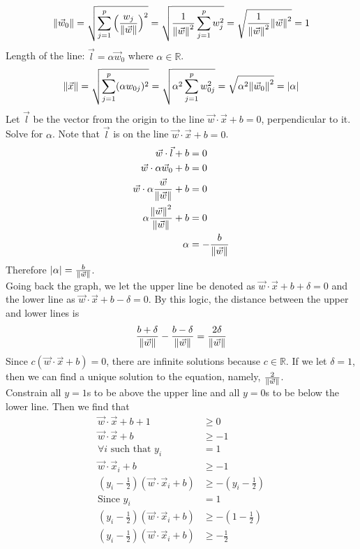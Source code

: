 \documentclass[12pt]{article}
\begin{document}
$$ \norm{\vec{w}_0} = \sqrt{ \sum_{j=1}^p \Big( \frac{w_j}{\norm{\vec{w}}} \Big)^2} = \sqrt{ \frac{1}{\norm{\vec{w}}^2} \sum_{j=1}^p w_j^2} = \sqrt{ \frac{1}{\norm{\vec{w}}^2} \norm{\vec{w}}^2} = 1 $$ 
Length of the line: $\vec{l} = \alpha \vec{w}_0$ where $\alpha \in \mathbb{R}$. 
$$ \norm{\vec{x}} = \sqrt{ \sum_{j=1}^p (\alpha w_{0j})^2} = \sqrt{ \alpha^2 \sum_{j=1}^p w_{0j}^2} = \sqrt{\alpha^2 \norm{\vec{w}_0}^2} = \abs{\alpha} $$ 
Let $\vec{l}$ be the vector from the origin to the line $\vec{w} \cdot \vec{x} + b = 0$, perpendicular to it. Solve for $\alpha$. Note that $\vec{l}$ is on the line $\vec{w} \cdot \vec{x} + b = 0$. 
$$ \begin{aligned} \vec{w} \cdot \vec{l} + b &= 0 \\ \vec{w} \cdot \alpha \vec{w}_0 + b &= 0 \\ 
\vec{w} \cdot \alpha \frac{ \vec{w}}{\norm{\vec{w}}} + b &= 0 \\ \alpha \frac{\norm{\vec{w}}^2}{\norm{\vec{w}}} + b &= 0 \\ \alpha &= - \frac{b}{\norm{\vec{w}}} \end{aligned} $$ Therefore 
$\abs{\alpha} = \frac{b}{\norm{\vec{w}}}$. \\
Going back the graph, we let the upper line be denoted as $\vec{w} \cdot \vec{x} + b + \delta = 0$ and the lower line as $\vec{w} \cdot \vec{x} + b - \delta = 0$. By this logic, the distance between the upper and lower lines is 
$$ \frac{b + \delta}{\norm{\vec{w}}} - \frac{b - \delta}{\norm{\vec{w}}} = \frac{2\delta}{\norm{\vec{w}}} $$ Since $c(\vec{w} \cdot \vec{x} + b) = 0$, there are infinite solutions because $c \in \mathbb{R}$. If we let $\delta = 1$, then we can find a unique solution to the equation, namely, $\frac{2}{\norm{\vec{w}}}$. \\
Constrain all $y = 1$s to be above the upper line and all $y = 0$s to be below the lower line. 
Then we find that $$ \begin{aligned} \vec{w} \cdot \vec{x} + b + 1 &\geq 0 \\ \vec{w} \cdot \vec{x} + b &\geq -1 \\ \forall i \text{ such that } y_i &= 1 \\ \vec{w} \cdot \vec{x}_i + b &\geq -1 \\ (y_i - \frac{1}{2})(\vec{w} \cdot \vec{x}_i + b) &\geq -(y_i - \frac{1}{2}) \\ \text{Since } y_i &= 1 \\ (y_i - \frac{1}{2})(\vec{w} \cdot \vec{x}_i + b) &\geq -(1 - \frac{1}{2}) \\ (y_i - \frac{1}{2})(\vec{w} \cdot \vec{x}_i + b) &\geq -\frac{1}{2} \end{aligned} $$ 
\end{document}
